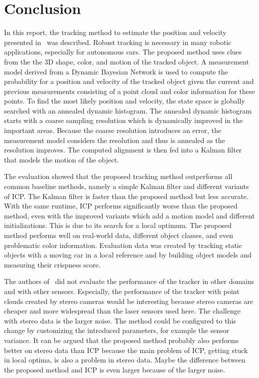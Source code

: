 \documentclass[twoside,a4paper,article]{combine}
\begin{document}
\section{Conclusion}
\label{sec:conclusion}
In this report, the tracking method to estimate the position and
velocity presented in~\cite{paper} was described. Robust tracking is
necessary in many robotic applications, especially for autonomous
cars. The proposed method uses clues from the the 3D shape, color, and
motion of the tracked object. A measurement model derived from a
Dynamic Bayesian Network is used to compute the probability for a
position and velocity of the tracked object given the current and
previous measurements consisting of a point cloud and color information
for these points.  To find the most likely position and velocity, the
state space is globally searched with an annealed dynamic
histogram. The annealed dynamic histogram starts with a coarse
sampling resolution which is dynamically improved in the important
areas. Because the coarse resolution introduces an error, the
measurement model considers the resolution and thus is annealed as the
resolution improves.  The computed alignment is then fed into a Kalman
filter that models the motion of the object.

The evaluation showed that the proposed tracking method outperforms
all common baseline methods, namely a simple Kalman filter and
different variants of ICP. The Kalman filter is faster than the
proposed method but less accurate. With the same runtime, ICP performs
significantly worse than the proposed method, even with the improved
variants which add a motion model and different initializations. This
is due to its search for a local optimum.
The proposed method performs well on real-world data, different object
classes, and even problematic color information.
Evaluation data was created by tracking static objects with a moving car in
a local reference and by building object models and measuring their
crispness score.

The authors of~\cite{paper} did not evaluate the performance of the
tracker in other domains and with other sensors. Especially, the
performance of the tracker with point clouds created by stereo cameras
would be interesting because stereo cameras are cheaper and more
widespread than the laser sensors used here. The challenge with stereo
data is the larger noise. The method could be configured to this
change by customizing the introduced parameters, for example the
sensor variance. It can be argued that the proposed method probably
also performs better on stereo data than ICP because the main problem
of ICP, getting stuck in local optima, is also a problem in stereo
data. Maybe the difference between the proposed method and ICP is even
larger because of the larger noise.
\end{document}
